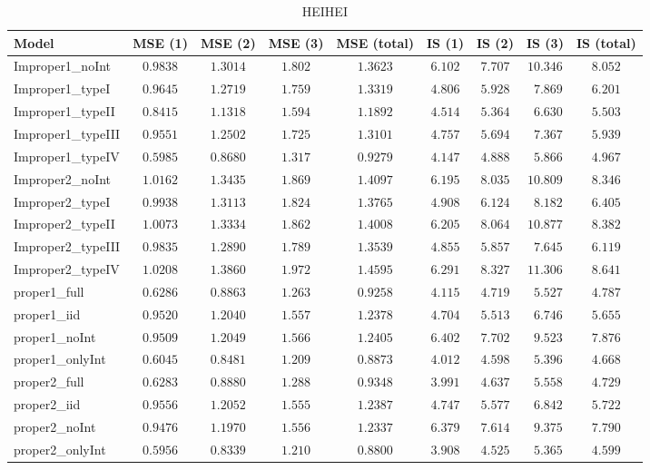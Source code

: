 \begin{table}

\caption{\label{tab:model-choice-sc10}HEIHEI}
\centering
\begin{tabular}{lcccccccc}
\hline
Model  & MSE (1) & MSE (2) & MSE (3) & MSE (total) & IS (1) & IS (2) & IS (3) & \multicolumn{1}{c}{IS (total)} \\ 
\hline
Improper1_noInt  & $0.9838$ & $1.3014$ & $1.802$ & $1.3623$ & $6.102$ & $7.707$ & $10.346$ & $8.052$ \\
Improper1_typeI  & $0.9645$ & $1.2719$ & $1.759$ & $1.3319$ & $4.806$ & $5.928$ & $\phantom{0}7.869$ & $6.201$ \\
Improper1_typeII  & $0.8415$ & $1.1318$ & $1.594$ & $1.1892$ & $4.514$ & $5.364$ & $\phantom{0}6.630$ & $5.503$ \\
Improper1_typeIII  & $0.9551$ & $1.2502$ & $1.725$ & $1.3101$ & $4.757$ & $5.694$ & $\phantom{0}7.367$ & $5.939$ \\
Improper1_typeIV  & $0.5985$ & $0.8680$ & $1.317$ & $0.9279$ & $4.147$ & $4.888$ & $\phantom{0}5.866$ & $4.967$ \\
Improper2_noInt  & $1.0162$ & $1.3435$ & $1.869$ & $1.4097$ & $6.195$ & $8.035$ & $10.809$ & $8.346$ \\
Improper2_typeI  & $0.9938$ & $1.3113$ & $1.824$ & $1.3765$ & $4.908$ & $6.124$ & $\phantom{0}8.182$ & $6.405$ \\
Improper2_typeII  & $1.0073$ & $1.3334$ & $1.862$ & $1.4008$ & $6.205$ & $8.064$ & $10.877$ & $8.382$ \\
Improper2_typeIII  & $0.9835$ & $1.2890$ & $1.789$ & $1.3539$ & $4.855$ & $5.857$ & $\phantom{0}7.645$ & $6.119$ \\
Improper2_typeIV  & $1.0208$ & $1.3860$ & $1.972$ & $1.4595$ & $6.291$ & $8.327$ & $11.306$ & $8.641$ \\
proper1_full  & $0.6286$ & $0.8863$ & $1.263$ & $0.9258$ & $4.115$ & $4.719$ & $\phantom{0}5.527$ & $4.787$ \\
proper1_iid  & $0.9520$ & $1.2040$ & $1.557$ & $1.2378$ & $4.704$ & $5.513$ & $\phantom{0}6.746$ & $5.655$ \\
proper1_noInt  & $0.9509$ & $1.2049$ & $1.566$ & $1.2405$ & $6.402$ & $7.702$ & $\phantom{0}9.523$ & $7.876$ \\
proper1_onlyInt  & $0.6045$ & $0.8481$ & $1.209$ & $0.8873$ & $4.012$ & $4.598$ & $\phantom{0}5.396$ & $4.668$ \\
proper2_full  & $0.6283$ & $0.8880$ & $1.288$ & $0.9348$ & $3.991$ & $4.637$ & $\phantom{0}5.558$ & $4.729$ \\
proper2_iid  & $0.9556$ & $1.2052$ & $1.555$ & $1.2387$ & $4.747$ & $5.577$ & $\phantom{0}6.842$ & $5.722$ \\
proper2_noInt  & $0.9476$ & $1.1970$ & $1.556$ & $1.2337$ & $6.379$ & $7.614$ & $\phantom{0}9.375$ & $7.790$ \\
proper2_onlyInt  & $0.5956$ & $0.8339$ & $1.210$ & $0.8800$ & $3.908$ & $4.525$ & $\phantom{0}5.365$ & $4.599$ \\
\hline 
\end{tabular}


\end{table}